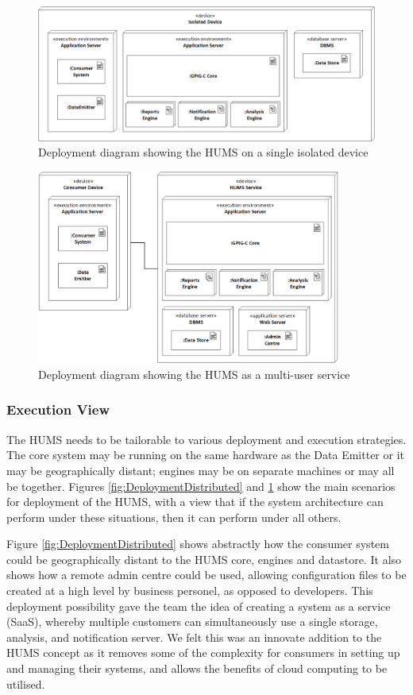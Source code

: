 \documentclass[10pt,a4paper]{article}
\begin{document}
\begin{figure}[!ht]
  \centering
  \includegraphics[width=12.5cm]{images/DeploymentIsolated.png}
  \caption{Deployment diagram showing the HUMS on a single isolated device}
  \label{fig:DeploymentIsolated}
\end{figure}

\begin{figure}[]
  \centering
  \includegraphics[width=10cm]{images/DeploymentService.png}
  \caption{Deployment diagram showing the HUMS as a multi-user service}
  \label{fig:DeploymentService}
\end{figure}

\subsubsection{Execution View}

The HUMS needs to be tailorable to various deployment and execution strategies. The core system may be running on the same hardware as the Data Emitter or it may be geographically distant; engines may be on separate machines or may all be together. Figures \ref{fig:DeploymentDistributed} and \ref{fig:DeploymentIsolated} show the main scenarios for deployment of the HUMS, with a view that if the system architecture can perform under these situations, then it can perform under all others.

Figure \ref{fig:DeploymentDistributed} shows abstractly how the consumer system could be geographically distant to the HUMS core, engines and datastore. It also shows how a remote admin centre could be used, allowing configuration files to be created at a high level by business personel, as opposed to developers. This deployment possibility gave the team the idea of creating a system as a service (SaaS), whereby multiple customers can simultaneously use a single storage, analysis, and notification server. We felt this was an innovate addition to the HUMS concept as it removes some of the complexity for consumers in setting up and managing their systems, and allows the benefits of cloud computing to be utilised.
\end{document}
